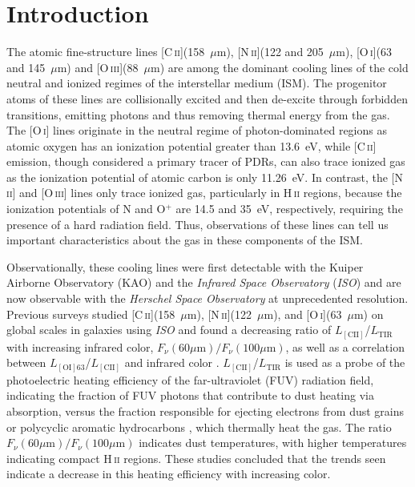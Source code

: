 
\section{Introduction}\label{intro3}
The atomic fine-structure lines [C\,\textsc{ii}](158~$\mu$m), [N\,\textsc{ii}](122 and 205~$\mu$m), [O\,\textsc{i}](63 and 145~$\mu$m) and [O\,\textsc{iii}](88~$\mu$m) are among the dominant cooling lines of the cold neutral and ionized regimes of the interstellar medium (ISM).  The progenitor atoms of these lines are collisionally excited and then de-excite through forbidden transitions, emitting photons and thus removing thermal energy from the gas.  The [O\,\textsc{i}] lines originate in the neutral regime of photon-dominated regions \citep[PDRs; ][]{1985ApJ...291..722T} as atomic oxygen has an ionization potential greater than 13.6~eV, while [C\,\textsc{ii}] emission, though considered a primary tracer of PDRs, can also trace ionized gas as the ionization potential of atomic carbon is only 11.26~eV.  In contrast, the [N\,\textsc{ii}] and [O\,\textsc{iii}] lines only trace ionized gas, particularly in H\,\textsc{ii} regions, because the ionization potentials of N and O$^{+}$ are 14.5 and 35~eV, respectively, requiring the presence of a hard radiation field.  Thus, observations of these lines can tell us important characteristics about the gas in these components of the ISM.  

Observationally, these cooling lines were first detectable with the Kuiper Airborne Observatory (KAO) and the \emph{Infrared Space Observatory} (\emph{ISO}) and are now observable with the \emph{Herschel Space Observatory} \citep{2010A&A...518L...1P} at unprecedented resolution.  Previous surveys studied [C\,\textsc{ii}](158~$\mu$m), [N\,\textsc{ii}](122~$\mu$m), and [O\,\textsc{i}](63~$\mu$m) on global scales in galaxies using \emph{ISO} and found a decreasing ratio of $L_{\mathrm{[CII]}}$/$L_{\mathrm{TIR}}$ with increasing infrared color, $F_{\nu}(60 \mu\mathrm{m})/F_{\nu}(100 \mu\mathrm{m})$, as well as a correlation between $L_{\mathrm{[OI]63}}$/$L_{\mathrm{[CII]}}$ and infrared color \citep[e.g.][]{1997ApJ...491L..27M,2001ApJ...561..766M,2001A&A...375..566N,2008ApJS..178..280B}.  $L_{\mathrm{[CII]}}$/$L_{\mathrm{TIR}}$ is used as a probe of the photoelectric heating efficiency of the far-ultraviolet (FUV) radiation field, indicating the fraction of FUV photons that contribute to dust heating via absorption, versus the fraction responsible for ejecting electrons from dust grains or polycyclic aromatic hydrocarbons \citep[PAHs; ][]{1985ApJ...291..722T, 2001ApJ...561..766M}, which thermally heat the gas.  The ratio $F_{\nu}(60 \mu\mathrm{m})/F_{\nu}(100 \mu\mathrm{m})$ indicates dust temperatures, with higher temperatures indicating compact H\,\textsc{ii} regions. These studies concluded that the trends seen indicate a decrease in this heating efficiency with increasing color.

